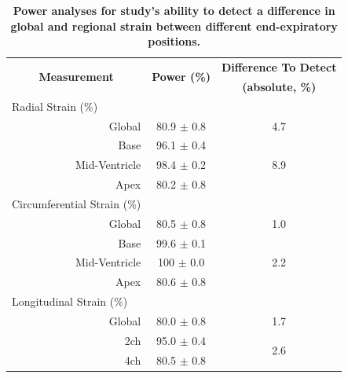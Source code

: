 	\begin{table}
		\centering
		\caption[Power analyses for study’s ability to detect a difference in global and regional strain between different end-expiratory positions]{\textbf{Power analyses for study’s ability to detect a difference in global and regional strain between different end-expiratory positions.}}
		\label{table:strainDifferencesPower}
		\begin{tabular}{c c c}
			\toprule
			\multirow{2}{*}{\textbf{Measurement}} & \multirow{2}{*}{\textbf{Power (\%)}} & \textbf{Difference To Detect}  \\
			 & & \textbf{(absolute, \%)}\\
			\midrule
			\multicolumn{1}{l}{Radial Strain (\%)} & &                                 \\
			\multicolumn{1}{r}{Global}  	  & 80.9 $\pm$ 0.8 & 4.7                   \\
			\multicolumn{1}{r}{Base}  		  & 96.1 $\pm$ 0.4 & \multirow{3}{*}{8.9}  \\
			\multicolumn{1}{r}{Mid-Ventricle} & 98.4 $\pm$ 0.2 &                       \\
			\multicolumn{1}{r}{Apex}  		  & 80.2 $\pm$ 0.8 &                       \\
			\multicolumn{1}{l}{Circumferential Strain (\%)} & &                        \\
			\multicolumn{1}{r}{Global}  	  & 80.5 $\pm$ 0.8 & 1.0                   \\
			\multicolumn{1}{r}{Base}  		  & 99.6 $\pm$ 0.1 & \multirow{3}{*}{2.2}  \\
			\multicolumn{1}{r}{Mid-Ventricle} & 100 $\pm$ 0.0  &                       \\
			\multicolumn{1}{r}{Apex}  		  & 80.6 $\pm$ 0.8 &                       \\
			\multicolumn{1}{l}{Longitudinal Strain (\%)} & & 	    				   \\
			\multicolumn{1}{r}{Global}        & 80.0 $\pm$ 0.8 &  1.7                  \\
			\multicolumn{1}{r}{2ch}  		  & 95.0 $\pm$ 0.4 &  \multirow{2}{*}{2.6} \\
			\multicolumn{1}{r}{4ch}  		  & 80.5 $\pm$ 0.8 &     				   \\ 
			\bottomrule
		\end{tabular}
	\end{table}

